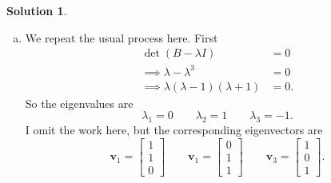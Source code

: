 \documentclass[12pt]{report} %
\theoremstyle{definition}
\newtheorem{solution}{Solution}
\begin{document}
\begin{solution}
\begin{enumerate}[(a)]
    \item We repeat the usual process here.  First
    \begin{align*}
        \det(B-\lambda I)&=0\\
        \implies \lambda-\lambda^3&=0\\
        \implies \lambda(\lambda-1)(\lambda+1)&=0.
    \end{align*}
    So the eigenvalues are 
    \[
    \lambda_1 = 0 \qquad \lambda_2 = 1 \qquad \lambda_3=-1.
    \]
    I omit the work here, but the corresponding eigenvectors are
    \[
    \mathbf{v}_1= \begin{bmatrix} 1\\ 1\\ 0 \end{bmatrix} \qquad \mathbf{v}_1=\begin{bmatrix} 0 \\ 1 \\ 1 \end{bmatrix} \qquad \mathbf{v}_3=\begin{bmatrix} 1 \\ 0 \\ 1\end{bmatrix}.
    \]
    
\end{enumerate}
\end{solution}
\end{document}
